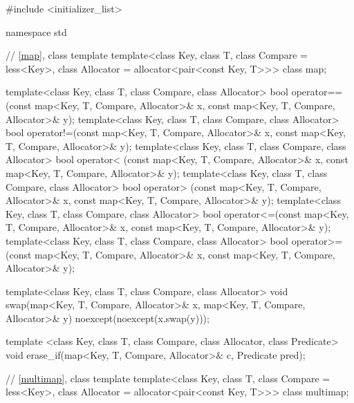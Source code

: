 %
\begin{codeblock}
#include <initializer_list>

namespace std {
  // \ref{map}, class template 
  template<class Key, class T, class Compare = less<Key>,
           class Allocator = allocator<pair<const Key, T>>>
    class map;

  template<class Key, class T, class Compare, class Allocator>
    bool operator==(const map<Key, T, Compare, Allocator>& x,
                    const map<Key, T, Compare, Allocator>& y);
  template<class Key, class T, class Compare, class Allocator>
    bool operator!=(const map<Key, T, Compare, Allocator>& x,
                    const map<Key, T, Compare, Allocator>& y);
  template<class Key, class T, class Compare, class Allocator>
    bool operator< (const map<Key, T, Compare, Allocator>& x,
                    const map<Key, T, Compare, Allocator>& y);
  template<class Key, class T, class Compare, class Allocator>
    bool operator> (const map<Key, T, Compare, Allocator>& x,
                    const map<Key, T, Compare, Allocator>& y);
  template<class Key, class T, class Compare, class Allocator>
    bool operator<=(const map<Key, T, Compare, Allocator>& x,
                    const map<Key, T, Compare, Allocator>& y);
  template<class Key, class T, class Compare, class Allocator>
    bool operator>=(const map<Key, T, Compare, Allocator>& x,
                    const map<Key, T, Compare, Allocator>& y);

  template<class Key, class T, class Compare, class Allocator>
    void swap(map<Key, T, Compare, Allocator>& x,
              map<Key, T, Compare, Allocator>& y)
      noexcept(noexcept(x.swap(y)));

  template <class Key, class T, class Compare, class Allocator, class Predicate>
    void erase_if(map<Key, T, Compare, Allocator>& c, Predicate pred);

  // \ref{multimap}, class template 
  template<class Key, class T, class Compare = less<Key>,
           class Allocator = allocator<pair<const Key, T>>>
    class multimap;

}
\end{codeblock}
